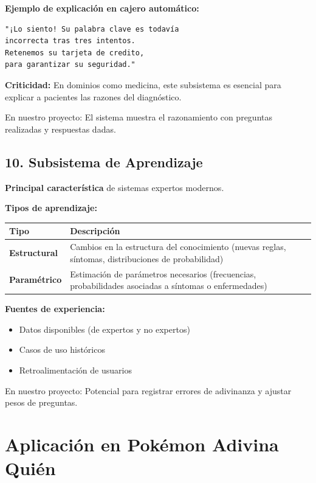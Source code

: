 \documentclass[12pt,a4paper]{article}
\begin{document}
\textbf{Ejemplo de explicación en cajero automático:}
\begin{lstlisting}
"¡Lo siento! Su palabra clave es todavía 
incorrecta tras tres intentos.
Retenemos su tarjeta de credito, 
para garantizar su seguridad."
\end{lstlisting}

\textbf{Criticidad:} En dominios como medicina, este subsistema es esencial para explicar a pacientes las razones del diagnóstico.

En nuestro proyecto: El sistema muestra el razonamiento con preguntas realizadas y respuestas dadas.

\subsection{10. Subsistema de Aprendizaje}

\textbf{Principal característica} de sistemas expertos modernos.

\textbf{Tipos de aprendizaje:}

\begin{center}
\begin{tabular}{|l|p{7cm}|}
\hline
\textbf{Tipo} & \textbf{Descripción} \\
\hline
\textbf{Estructural} & Cambios en la estructura del conocimiento (nuevas reglas, síntomas, distribuciones de probabilidad) \\
\hline
\textbf{Paramétrico} & Estimación de parámetros necesarios (frecuencias, probabilidades asociadas a síntomas o enfermedades) \\
\hline
\end{tabular}
\end{center}

\textbf{Fuentes de experiencia:}
\begin{itemize}
    \item Datos disponibles (de expertos y no expertos)
    \item Casos de uso históricos
    \item Retroalimentación de usuarios
\end{itemize}

En nuestro proyecto: Potencial para registrar errores de adivinanza y ajustar pesos de preguntas.

\section{Aplicación en Pokémon Adivina Quién}
\end{document}
